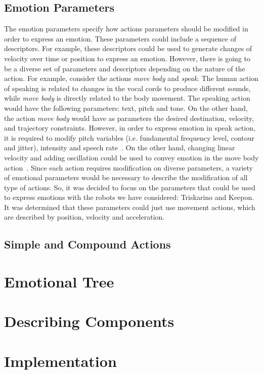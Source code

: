 \documentclass[letterpaper, 10 pt, conference]{ieeeconf}  %
\begin{document}
\subsection{Emotion Parameters}
The emotion parameters specify how actions parameters should be modified in order to express an emotion. These parameters could include a sequence of descriptors. For example, these descriptors could be used to generate changes of velocity over time or position to express an emotion. However, there is going to be a diverse set of parameters and descriptors depending on the nature of the action. For example, consider the actions \textit{move body} and \textit{speak}. The human action of speaking is related to changes in the vocal cords to produce different sounds, while \textit{move body} is directly related to the body movement. The speaking action would have the following parameters: text, pitch and tone. On the other hand, the action \textit{move body} would have as parameters the desired destination, velocity, and trajectory constraints. However, in order to express emotion in speak action, it is required to modify pitch variables (i.e. fundamental frequency level, contour and jitter), intensity and speech rate~\cite{Gunes2011}. On the other hand, changing linear velocity and adding oscillation could be used to convey emotion in the move body action~\cite{Angel2016c}. Since each action requires modification on diverse parameters, a variety of emotional parameters would be necessary to describe the modification of all type of actions. So, it was decided to focus on the parameters that could be used to express emotions with the robots we have considered: Triskarino and Keepon. It was determined that these parameters could just use movement actions, which are described by position, velocity and acceleration.    
\subsection{Simple and Compound Actions}
 
\section{Emotional Tree}
\label{sec:emotional_execution_tree}

\section{Describing Components}
\label{sec:description}

\section{Implementation}
\label{sec:implementation}

\end{document}
